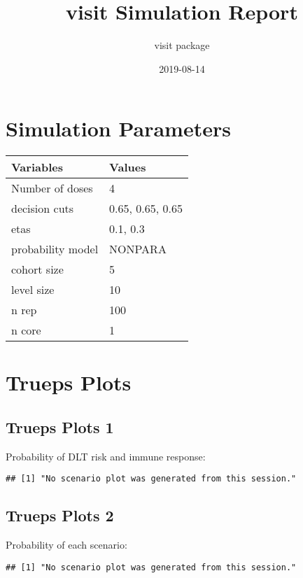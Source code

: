 \documentclass[]{article}
\title{visit Simulation Report}
\author{visit package}
\date{2019-08-14}
\begin{document}
\maketitle

{
\setcounter{tocdepth}{3}
\tableofcontents
}
\clearpage

\hypertarget{simulation-parameters}{%
\section{Simulation Parameters}\label{simulation-parameters}}

\begin{longtable}[]{@{}ll@{}}
\toprule
Variables & Values\tabularnewline
\midrule
\endhead
Number of doses & 4\tabularnewline
decision cuts & 0.65, 0.65, 0.65\tabularnewline
etas & 0.1, 0.3\tabularnewline
probability model & NONPARA\tabularnewline
cohort size & 5\tabularnewline
level size & 10\tabularnewline
n rep & 100\tabularnewline
n core & 1\tabularnewline
\bottomrule
\end{longtable}

\clearpage

\hypertarget{trueps-plots}{%
\section{Trueps Plots}\label{trueps-plots}}

\hypertarget{trueps-plots-1}{%
\subsection{Trueps Plots 1}\label{trueps-plots-1}}

Probability of DLT risk and immune response:

\begin{verbatim}
## [1] "No scenario plot was generated from this session."
\end{verbatim}

\clearpage

\hypertarget{trueps-plots-2}{%
\subsection{Trueps Plots 2}\label{trueps-plots-2}}

Probability of each scenario:

\begin{verbatim}
## [1] "No scenario plot was generated from this session."
\end{verbatim}
\end{document}

